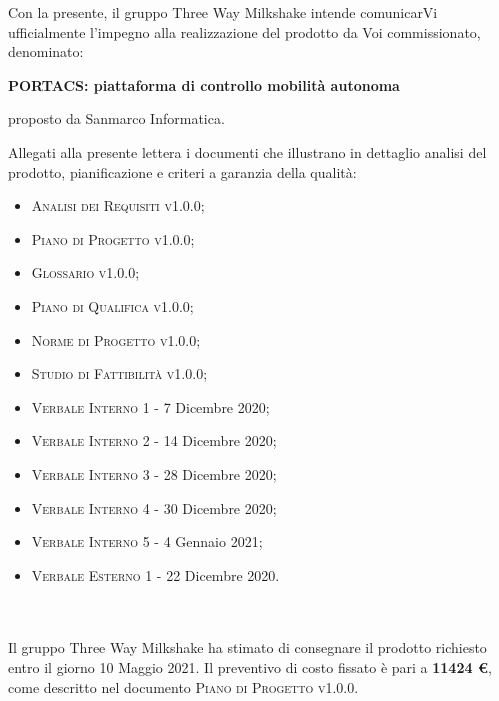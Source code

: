 \documentclass[10pt,stdletter,dateno,sigright]{newlfm}  %
\begin{document}
    \begin{newlfm}


        Con la presente, il gruppo Three Way Milkshake intende comunicarVi ufficialmente l'impegno alla realizzazione del prodotto da Voi commissionato, denominato:
        \begin{center}
            \textbf{PORTACS: piattaforma di controllo mobilità autonoma}
        \end{center}
        proposto da Sanmarco Informatica.

        Allegati alla presente lettera i documenti che illustrano in dettaglio analisi del prodotto, pianificazione e criteri a garanzia della qualità:

        \begin{itemize}
            \item \textsc{Analisi dei Requisiti v1.0.0;}
            \item \textsc{Piano di Progetto v1.0.0;}
            \item \textsc{Glossario v1.0.0;}
            \item \textsc{Piano di Qualifica v1.0.0;}
            \item \textsc{Norme di Progetto v1.0.0;}
            \item \textsc{Studio di Fattibilità v1.0.0;}
            \item \textsc{Verbale Interno 1} - 7 Dicembre 2020;
            \item \textsc{Verbale Interno 2} - 14 Dicembre 2020;
            \item \textsc{Verbale Interno 3} - 28 Dicembre 2020;
            \item \textsc{Verbale Interno 4} - 30 Dicembre 2020;
            \item \textsc{Verbale Interno 5} - 4 Gennaio 2021;
            \item \textsc{Verbale Esterno 1} - 22 Dicembre 2020.
        \end{itemize}
        \ \\
        \ \\
        Il gruppo Three Way Milkshake ha stimato di consegnare il prodotto richiesto entro il giorno 10 Maggio 2021.
        Il preventivo di costo fissato \`e pari a \textbf{11424  \euro}, come descritto nel documento \textsc{Piano di Progetto v1.0.0}.
        \\


\end{newlfm}
\end{document}
